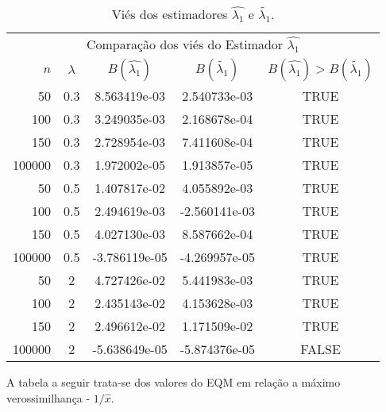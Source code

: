 \documentclass[12pt]{article}
\begin{document}
\begin{table}[H]
\caption{Viés dos estimadores $\hat{\lambda_{1}}$ e $\tilde{\lambda_{1}}$.}
\label{tab:p1Vies}
\centering
\begin{tabular}{rcccc}
\toprule
\multicolumn{5}{c}{Comparação dos viés do Estimador $\hat{\lambda_{1}}$}\\
$n$ & $\lambda$ & $B(\hat{\lambda_{1}})$ & $B(\tilde{\lambda_{1}})$ & $B(\hat{\lambda_{1}})>B(\tilde{\lambda_{1}})$ \\
\midrule
50 & 0.3 & 8.563419e-03 & 2.540733e-03  & TRUE \\
100 & 0.3 & 3.249035e-03 & 2.168678e-04 & TRUE \\
150 & 0.3 & 2.728954e-03 & 7.411608e-04 & TRUE \\
100000 & 0.3 & 1.972002e-05 & 1.913857e-05 & TRUE \\
\midrule
50 & 0.5 & 1.407817e-02 & 4.055892e-03  & TRUE \\
100 & 0.5 &  2.494619e-03 & -2.560141e-03 & TRUE \\
150 & 0.5 &  4.027130e-03  & 8.587662e-04 & TRUE\\
100000 & 0.5 & -3.786119e-05 & -4.269957e-05 & TRUE \\
\midrule
50 & 2 & 4.727426e-02 &  5.441983e-03 & TRUE \\
100 & 2 & 2.435143e-02 & 4.153628e-03 & TRUE \\
150 & 2 & 2.496612e-02 & 1.171509e-02 & TRUE \\
100000 & 2 & -5.638649e-05 & -5.874376e-05 & FALSE \\
\bottomrule
\end{tabular}
\end{table}

A tabela a seguir trata-se dos valores do EQM em relação a máximo verossimilhança - $1/\hat{x}$.
\end{document}
